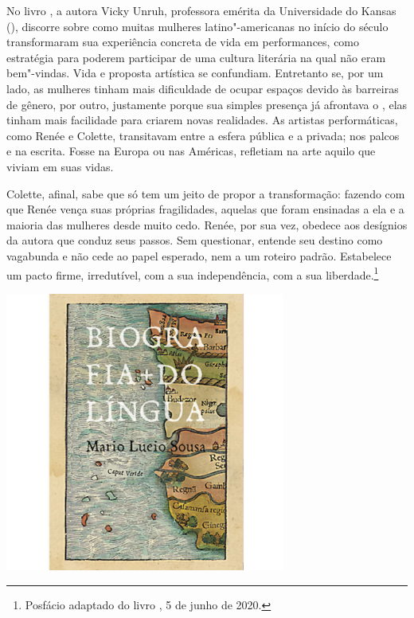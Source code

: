 \begin{changemargin}
No livro {}, a autora Vicky Unruh, professora emérita da Universidade do Kansas (), discorre sobre como muitas mulheres latino"-americanas no início do século  transformaram sua experiência concreta de vida em performances, como estratégia para poderem participar de uma cultura literária na qual não eram bem"-vindas. Vida e proposta artística se confundiam. Entretanto se, por um lado, as mulheres tinham mais dificuldade de ocupar espaços devido às barreiras de gênero, por outro, justamente porque sua simples presença já afrontava o {}, elas tinham mais facilidade para criarem novas realidades. As artistas performáticas, como Renée e Colette, transitavam entre a esfera pública e a privada; nos palcos e na escrita. Fosse na Europa ou nas Américas, refletiam na arte aquilo que viviam em suas vidas.

Colette, afinal, sabe que só tem um jeito de propor a transformação: fazendo com que Renée vença suas próprias fragilidades, aquelas que foram ensinadas a ela e a maioria das mulheres desde muito cedo. Renée, por sua vez, obedece aos desígnios da autora que conduz seus passos. Sem questionar, entende seu destino como vagabunda e não cede ao papel esperado, nem a um roteiro padrão. Estabelece um pacto firme, irredutível, com a sua independência, com a sua liberdade.\footnote{Posfácio adaptado do livro {}, 5 de junho de 2020.}

\pagebreak
\end{changemargin}

\pagebreak %


\begin{center}
\hspace*{.5cm}\includegraphics[width=92mm]{./grid/lingua.jpg}
\end{center}

